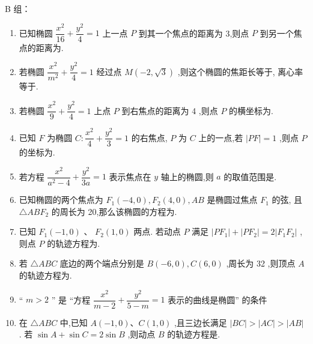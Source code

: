 B 组：
\begin{enumerate}
    \item 已知椭圆 $\dfrac{{x}^{2}}{16} + \dfrac{{y}^{2}}{4} = 1$ 上一点 $P$ 到其一个焦点的距离为 3,则点 $P$ 到另一个焦点的距离为.

    \item 若椭圆 $\dfrac{{x}^{2}}{{m}^{2}} + \dfrac{{y}^{2}}{4} = 1$ 经过点 $M\left( {-2,\sqrt{3}}\right)$ ,则这个椭圆的焦距长等于, 离心率等于.

    \item 若椭圆 $\dfrac{{x}^{2}}{9} + \dfrac{{y}^{2}}{4} = 1$ 上点 $P$ 到右焦点的距离为 4 ,则点 $P$ 的横坐标为.

    \item 已知 $F$ 为椭圆 $C : \dfrac{{x}^{2}}{4} + \dfrac{{y}^{2}}{3} = 1$ 的右焦点, $P$ 为 $C$ 上的一点,若 $\left| {PF}\right|  = 1$ ,则点 $P$ 的坐标为.

    \item 若方程 $\dfrac{{x}^{2}}{{a}^{2} - 4} + \dfrac{{y}^{2}}{3a} = 1$ 表示焦点在 $y$ 轴上的椭圆,则 $a$ 的取值范围是.

    \item 已知椭圆的两个焦点为 ${F}_{1}\left( {-4,0}\right) ,{F}_{2}\left( {4,0}\right) ,{AB}$ 是椭圆过焦点 ${F}_{1}$ 的弦, 且 $\bigtriangleup  {AB}{F}_{2}$ 的周长为 20,那么该椭圆的方程为.

    \item 已知 ${F}_{1}\left( {-1,0}\right)$ 、 ${F}_{2}\left( {1,0}\right)$ 两点. 若动点 $P$ 满足 $\left| {P{F}_{1}}\right|  + \left| {P{F}_{2}}\right|  = 2\left| {{F}_{1}{F}_{2}}\right|$ ,则点 $P$ 的轨迹方程为.

    \item 若 $\bigtriangleup {ABC}$ 底边的两个端点分别是 ${B}\left( {-6,0}\right) ,{C}\left( {6,0}\right)$ ,周长为 32 ,则顶点 $A$ 的轨迹方程为.

    \item “ $m > 2$ ” 是 “方程 $\dfrac{{x}^{2}}{m - 2} + \dfrac{{y}^{2}}{5 - m} = 1$ 表示的曲线是椭圆” 的条件


    \item 在 $\bigtriangleup  {ABC}$ 中,已知 $A\left( {-1,0}\right) \text{、}C\left( {1,0}\right)$ ,且三边长满足 $\left| {BC}\right|  > \left| {AC}\right|  > \left| {AB}\right|$ . 若 $\sin A + \sin C = 2\sin B$ ,则动点 $B$ 的轨迹方程是.



\end{enumerate}

